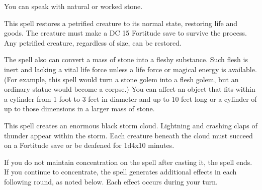 \begin{multicols}{2}
\begin{small}
\smallskip\noindent You can speak with natural or worked stone.

\noindent This spell restores a petrified creature to its normal state, restoring life and goods. The creature must make a DC 15 Fortitude save to survive the process. Any petrified creature, regardless of size, can be restored.

\smallskip\noindent The spell also can convert a mass of stone into a fleshy substance. Such flesh is inert and lacking a vital life force unless a life force or magical energy is available. (For example, this spell would turn a stone golem into a flesh golem, but an ordinary statue would become a corpse.) You can affect an object that fits within a cylinder from 1 foot to 3 feet in diameter and up to 10 feet long or a cylinder of up to those dimensions in a larger mass of stone.


\noindent This spell creates an enormous black storm cloud. Lightning and crashing claps of thunder appear within the storm. Each creature beneath the cloud must succeed on a Fortitude save or be deafened for 1d4x10 minutes.

\smallskip\noindent If you do not maintain concentration on the spell after casting it, the spell ends.  If you continue to concentrate, the spell generates additional effects in each following round, as noted below. Each effect occurs during your turn.


\end{small}
\end{multicols}
